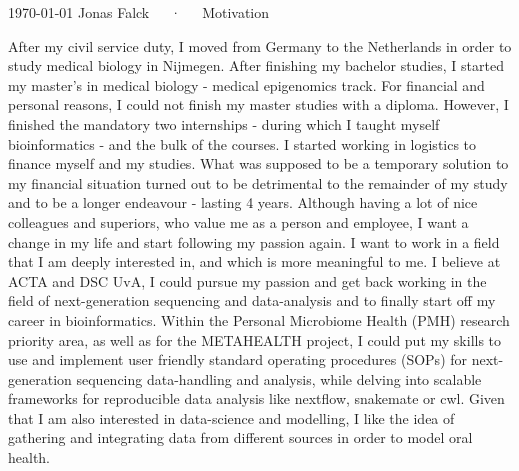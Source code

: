 \documentclass[11pt, a4paper]{awesome-cv}
\begin{document}
\makecvheader[R]

\makecvfooter
  {\today}
  {Jonas Falck~~~·~~~Motivation}
  {}

\makelettertitle

\begin{cvletter}

After my civil service duty, I moved from Germany to the Netherlands in order to study medical biology in Nijmegen.
After finishing my bachelor studies, I started my master's in medical biology - medical epigenomics track.
For financial and personal reasons, I could not finish my master studies with a diploma.
However, I finished the mandatory two internships - during which I taught myself bioinformatics - and the bulk of the courses.
I started working in logistics to finance myself and my studies.
What was supposed to be a temporary solution to my financial situation turned out to be detrimental to the remainder of my study and to be a longer endeavour - lasting 4 years.
Although having a lot of nice colleagues and superiors, who value me as a person and employee, I want a change in my life and start following my passion again.
I want to work in a field that I am deeply interested in, and which is more meaningful to me.
I believe at ACTA and DSC UvA, I could pursue my passion and get back working in the field of next-generation sequencing and data-analysis and to finally start off my career in bioinformatics.
Within the Personal Microbiome Health (PMH) research priority area, as well as for the METAHEALTH project, I could put my skills to use and implement user friendly standard operating procedures (SOPs) for next-generation sequencing data-handling and analysis, while delving into scalable frameworks for reproducible data analysis like nextflow, snakemate or cwl.
Given that I am also interested in data-science and modelling, I like the idea of gathering and integrating data from different sources in order to model oral health.

\end{cvletter}
\end{document}

